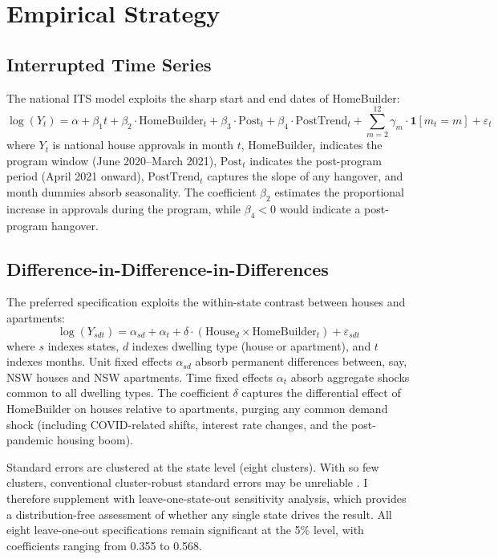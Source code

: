 \documentclass[12pt]{article}
\begin{document}
\section{Empirical Strategy}
\label{sec:strategy}

\subsection{Interrupted Time Series}

The national ITS model exploits the sharp start and end dates of HomeBuilder:
\begin{equation}
\log(Y_t) = \alpha + \beta_1 t + \beta_2 \cdot \text{HomeBuilder}_t + \beta_3 \cdot \text{Post}_t + \beta_4 \cdot \text{PostTrend}_t + \sum_{m=2}^{12} \gamma_m \cdot \mathbf{1}[m_t = m] + \varepsilon_t
\end{equation}
where $Y_t$ is national house approvals in month $t$, $\text{HomeBuilder}_t$ indicates the program window (June 2020--March 2021), $\text{Post}_t$ indicates the post-program period (April 2021 onward), $\text{PostTrend}_t$ captures the slope of any hangover, and month dummies absorb seasonality. The coefficient $\beta_2$ estimates the proportional increase in approvals during the program, while $\beta_4 < 0$ would indicate a post-program hangover.

\subsection{Difference-in-Difference-in-Differences}

The preferred specification exploits the within-state contrast between houses and apartments:
\begin{equation}
\log(Y_{sdt}) = \alpha_{sd} + \alpha_t + \delta \cdot (\text{House}_d \times \text{HomeBuilder}_t) + \varepsilon_{sdt}
\end{equation}
where $s$ indexes states, $d$ indexes dwelling type (house or apartment), and $t$ indexes months. Unit fixed effects $\alpha_{sd}$ absorb permanent differences between, say, NSW houses and NSW apartments. Time fixed effects $\alpha_t$ absorb aggregate shocks common to all dwelling types. The coefficient $\delta$ captures the differential effect of HomeBuilder on houses relative to apartments, purging any common demand shock (including COVID-related shifts, interest rate changes, and the post-pandemic housing boom).

Standard errors are clustered at the state level (eight clusters). With so few clusters, conventional cluster-robust standard errors may be unreliable \citep{cameron2008}. I therefore supplement with leave-one-state-out sensitivity analysis, which provides a distribution-free assessment of whether any single state drives the result. All eight leave-one-out specifications remain significant at the 5\% level, with coefficients ranging from 0.355 to 0.568.
\end{document}
